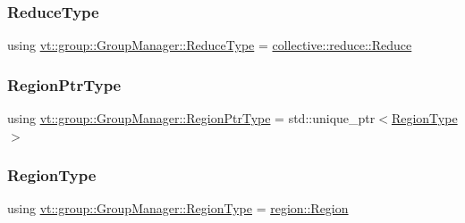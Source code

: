 \subsubsection{\texorpdfstring{Reduce\+Type}{ReduceType}}
{\footnotesize\ttfamily using \hyperlink{structvt_1_1group_1_1_group_manager_a28113adbc42622f7cf278fcaed4efefa}{vt\+::group\+::\+Group\+Manager\+::\+Reduce\+Type} =  \hyperlink{structvt_1_1collective_1_1reduce_1_1_reduce}{collective\+::reduce\+::\+Reduce}}

\mbox{\label{structvt_1_1group_1_1_group_manager_a9192e585fc2f99bfd5a6ff65fc21c40b}} 
\subsubsection{\texorpdfstring{Region\+Ptr\+Type}{RegionPtrType}}
{\footnotesize\ttfamily using \hyperlink{structvt_1_1group_1_1_group_manager_a9192e585fc2f99bfd5a6ff65fc21c40b}{vt\+::group\+::\+Group\+Manager\+::\+Region\+Ptr\+Type} =  std\+::unique\+\_\+ptr$<$\hyperlink{structvt_1_1group_1_1_group_manager_a38876227e6077059a67a5d5e5647d8a3}{Region\+Type}$>$}

\mbox{\label{structvt_1_1group_1_1_group_manager_a38876227e6077059a67a5d5e5647d8a3}} 
\subsubsection{\texorpdfstring{Region\+Type}{RegionType}}
{\footnotesize\ttfamily using \hyperlink{structvt_1_1group_1_1_group_manager_a38876227e6077059a67a5d5e5647d8a3}{vt\+::group\+::\+Group\+Manager\+::\+Region\+Type} =  \hyperlink{structvt_1_1group_1_1region_1_1_region}{region\+::\+Region}}

\mbox{\label{structvt_1_1group_1_1_group_manager_a9e0bcb0f3241a19b95d4f7fa092f4c8e}} 
